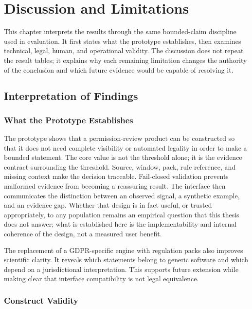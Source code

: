 \chapter{Discussion and Limitations}

This chapter interprets the results through the same bounded-claim discipline used in evaluation. It first states what the prototype establishes, then examines technical, legal, human, and operational validity. The discussion does not repeat the result tables; it explains why each remaining limitation changes the authority of the conclusion and which future evidence would be capable of resolving it.

\section{Interpretation of Findings}

\subsection{What the Prototype Establishes}

The prototype shows that a permission-review product can be constructed so that it does not need complete visibility or automated legality in order to make a bounded statement. The core value is not the threshold alone; it is the evidence contract surrounding the threshold. Source, window, pack, rule reference, and missing context make the decision traceable. Fail-closed validation prevents malformed evidence from becoming a reassuring result. The interface then communicates the distinction between an observed signal, a synthetic example, and an evidence gap. Whether that design is in fact useful, or trusted appropriately, to any population remains an empirical question that this thesis does not answer; what is established here is the implementability and internal coherence of the design, not a measured user benefit.

The replacement of a GDPR-specific engine with regulation packs also improves scientific clarity. It reveals which statements belong to generic software and which depend on a jurisdictional interpretation. This supports future extension while making clear that interface compatibility is not legal equivalence.

\subsection{Construct Validity}

